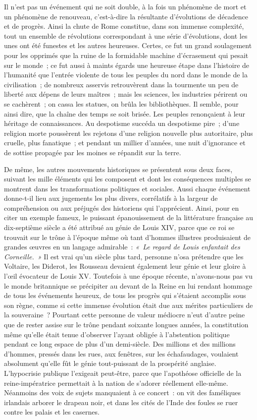 \documentclass[french,twoside]{book} %
\begin{document}
Il n’est pas un événement qui ne soit double, à la fois un phénomène de mort et un phénomène de renouveau, c’est-à-dire la résultante d’évolutions de décadence et de progrès. Ainsi la chute de Rome constitue, dans son immense complexité, tout un ensemble de révolutions correspondant à une série d’évolutions, dont les unes ont été funestes et les autres heureuses. Certes, ce fut un grand soulagement pour les opprimés  que la ruine de la formidable machine d’écrasement qui pesait sur le monde ; ce fut aussi à maints égards une heureuse étape dans l’histoire de l’humanité que l’entrée violente de tous les peuples du nord dans le monde de la civilisation ; de nombreux asservis retrouvèrent dans la tourmente un peu de liberté aux dépens de leurs maîtres ; mais les sciences, les industries périrent ou se cachèrent ; on cassa les statues, on brûla les bibliothèques. Il semble, pour ainsi dire, que la chaîne des temps se soit brisée. Les peuples renonçaient à leur héritage de connaissances. Au despotisme succéda un despotisme pire ; d’une religion morte poussèrent les rejetons d’une religion nouvelle plus autoritaire, plus cruelle, plus fanatique ;  et pendant un millier d’années, une nuit d’ignorance et de sottise propagée par les moines se répandit sur la terre.\par
De même, les autres mouvements historiques se présentent sous deux faces, suivant les mille éléments qui les composent et dont les conséquences multiples se montrent dans les transformations politiques et sociales. Aussi chaque événement donne-t-il lieu aux jugements les plus divers, corrélatifs à la largeur de compréhension ou aux préjugés des historiens qui l’apprécient. Ainsi, pour en citer un exemple fameux, le puissant épanouissement de la littérature française au dix-septième siècle a été attribué au génie de Louis XIV, parce que ce roi se trouvait sur le trône à l’époque même où tant  d’hommes illustres produisaient de grandes œuvres en un langage admirable : \emph{« Le regard de Louis enfantait des Corneille. »} Il est vrai qu’un siècle plus tard, personne n’osa prétendre que les Voltaire, les Diderot, les Rousseau devaient également leur génie et leur gloire à l’œil évocateur de Louis XV. Toutefois à une époque récente, n’avons-nous pas vu le monde britannique se précipiter au devant de la Reine en lui rendant hommage de tous les événements heureux, de tous les progrès qui s’étaient accomplis sous son règne, comme si cette immense évolution était due aux mérites particuliers de la souveraine ? Pourtant cette personne de valeur médiocre n’eut d’autre peine que de rester assise sur le trône pendant  soixante longues années, la constitution même qu’elle était tenue d’observer l’ayant obligée à l’abstention politique pendant ce long espace de plus d’un demi-siècle. Des millions et des millions d’hommes, pressés dans les rues, aux fenêtres, sur les échafaudages, voulaient absolument qu’elle fût le génie tout-puissant de la prospérité anglaise. L’hypocrisie publique l’exigeait peut-être, parce que l’apothéose officielle de la reine-impératrice permettait à la nation de s’adorer réellement elle-même. Néanmoins des voix de sujets manquaient à ce concert : on vit des faméliques irlandais arborer le drapeau noir, et dans les cités de l’Inde des foules se ruer contre les palais et les casernes.\par
\end{document}
